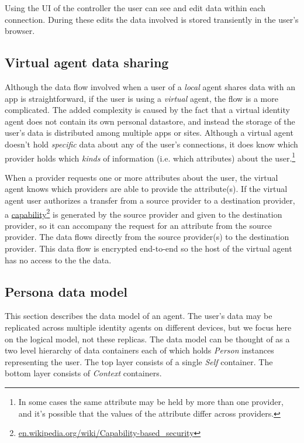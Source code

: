 \documentclass[11pt, oneside]{article}   	%
\newcommand{\hyperfootnote}[1][]{\def\ArgI{{#1}}\hyperfootnoteRelay}
\newcommand\hyperfootnoteRelay[2][]{\href{#1#2}{\ArgI}\footnote{\href{#1#2}{#2}}}
\begin{document}
Using the UI of the controller the user can see and edit data within each connection. During these edits the data involved is stored transiently in the user's browser.

\subsection{Virtual agent data sharing}

Although the data flow involved when a user of a \emph{local} agent shares data with an app is straightforward, if the user is using a \emph{virtual} agent, the flow is a more complicated. The added complexity is caused by the fact that a virtual identity agent does not contain its own personal datastore, and instead the storage of the user's data is distributed among multiple apps or sites. Although a virtual agent doesn't hold \emph{specific} data about any of the user's connections, it does know which provider holds which \emph{kinds} of information (i.e. which attributes) about the user.\footnote{In some cases the same attribute may be held by more than one provider, and it's possible that the values of the attribute differ across providers.}

When a provider requests one or more attributes about the user, the virtual agent knows which providers are able to provide the attribute(s). If the virtual agent user authorizes a transfer from a source provider to a destination provider, a \hyperfootnote[capability][https://]{en.wikipedia.org/wiki/Capability-based\_security} is generated by the source provider and given to the destination provider, so it can accompany the request for an attribute from the source provider. The data flows directly from the source provider(s) to the destination provider. This data flow is encrypted end-to-end so the host of the virtual agent has no access to the the data. 

\subsection{Persona data model}\label{data_model_subsection} 

This section describes the data model of an agent. The user's data may be replicated across multiple identity agents on different devices, but we focus here on the logical model, not these replicas. The data model can be thought of as a two level hierarchy of data containers each of which holds \emph{Person} instances representing the user. The top layer consists of a single \emph{Self} container. The bottom layer consists of \emph{Context} containers.
\end{document}
